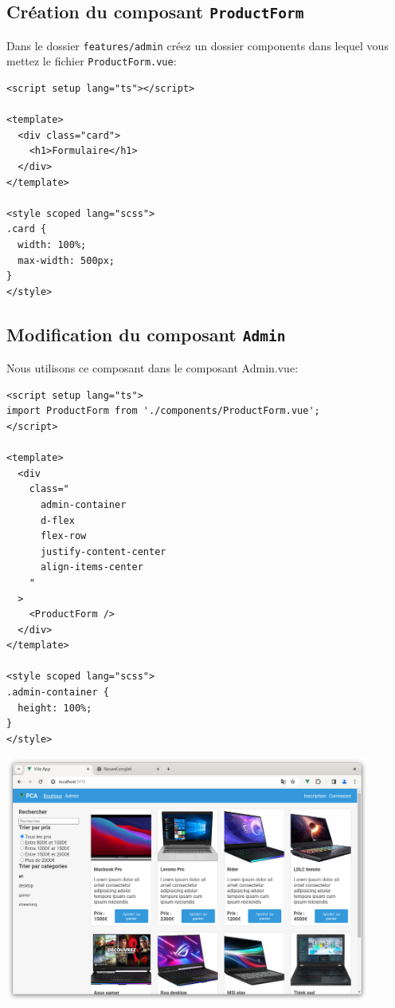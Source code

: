 \subsection{Création du composant {\tt ProductForm}}
Dans le dossier {\tt features/admin} créez un dossier {\color{monOrange}components} dans lequel vous mettez le fichier {\tt ProductForm.vue}:
\begin{verbatim}
<script setup lang="ts"></script>

<template>
  <div class="card">
    <h1>Formulaire</h1>
  </div>
</template>

<style scoped lang="scss">
.card {
  width: 100%;
  max-width: 500px;
}
</style>
\end{verbatim}
\subsection{Modification du composant {\tt Admin}}
Nous utilisons ce composant dans le composant {\color{monOrange}Admin.vue}:
\begin{verbatim}
<script setup lang="ts">
import ProductForm from './components/ProductForm.vue';
</script>

<template>
  <div
    class="
      admin-container
      d-flex
      flex-row
      justify-content-center
      align-items-center
    "
  >
    <ProductForm />
  </div>
</template>

<style scoped lang="scss">
.admin-container {
  height: 100%;
}
</style>
\end{verbatim}

\begin{center}
\includegraphics[width=12cm]{images/image34.png}
\end{center}

